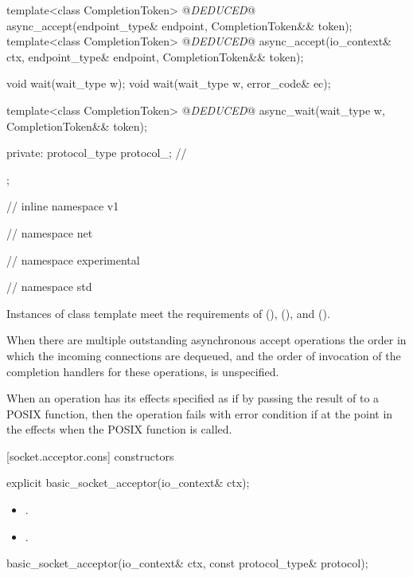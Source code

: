 \begin{codeblock}
{{{{{    template<class CompletionToken>
      @\textit{DEDUCED}@ async_accept(endpoint_type& endpoint,
                           CompletionToken&& token);
    template<class CompletionToken>
      @\textit{DEDUCED}@ async_accept(io_context& ctx, endpoint_type& endpoint,
                           CompletionToken&& token);

    void wait(wait_type w);
    void wait(wait_type w, error_code& ec);

    template<class CompletionToken>
      @\textit{DEDUCED}@ async_wait(wait_type w, CompletionToken&& token);

  private:
    protocol_type protocol_; // \expos
  };

} // inline namespace v1
} // namespace net
} // namespace experimental
} // namespace std
\end{codeblock}

\pnum
Instances of class template  meet the requirements of  (),  (), and  ().

\pnum
 When there are multiple outstanding asynchronous accept operations the order in which the incoming connections are dequeued, and the order of invocation of the completion handlers for these operations, is unspecified.

\pnum
When an operation has its effects specified as if by passing the result of  to a POSIX function, then the operation fails with error condition  if  at the point in the effects when the POSIX function is called.


[socket.acceptor.cons]{ constructors}

\begin{itemdecl}
explicit basic_socket_acceptor(io_context& ctx);
\end{itemdecl}

\begin{itemdescr}
\pnum
\postconditions 
\begin{itemize}
\item
{}.
\item
{}.
\end{itemize}
\end{itemdescr}

\begin{itemdecl}
basic_socket_acceptor(io_context& ctx, const protocol_type& protocol);
\end{itemdecl}

